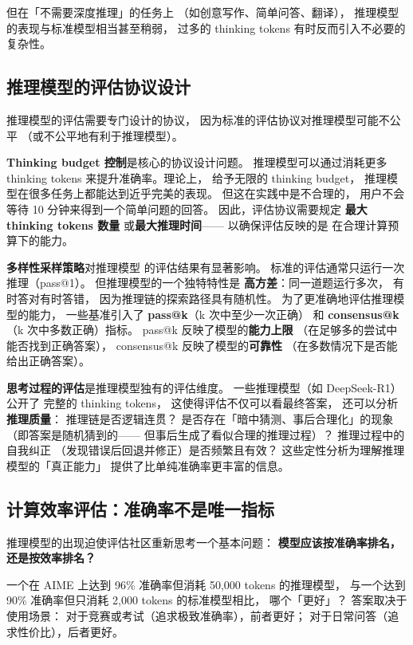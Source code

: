但在「不需要深度推理」的任务上
（如创意写作、简单问答、翻译），
推理模型的表现与标准模型相当甚至稍弱，
过多的 thinking tokens 有时反而引入不必要的复杂性。

\subsection{推理模型的评估协议设计}

推理模型的评估需要专门设计的协议，
因为标准的评估协议对推理模型可能不公平
（或不公平地有利于推理模型）。

\textbf{Thinking budget 控制}是核心的协议设计问题。
推理模型可以通过消耗更多 thinking tokens
来提升准确率。理论上，
给予无限的 thinking budget，
推理模型在很多任务上都能达到近乎完美的表现。
但这在实践中是不合理的，
用户不会等待 10 分钟来得到一个简单问题的回答。
因此，评估协议需要规定
\textbf{最大 thinking tokens 数量}
或\textbf{最大推理时间}——
以确保评估反映的是
在合理计算预算下的能力。

\textbf{多样性采样策略}对推理模型
的评估结果有显著影响。
标准的评估通常只运行一次推理（pass@1）。
但推理模型的一个独特特性是
\textbf{高方差}：同一道题运行多次，
有时答对有时答错，
因为推理链的探索路径具有随机性。
为了更准确地评估推理模型的能力，
一些基准引入了 \textbf{pass@k}（k 次中至少一次正确）
和 \textbf{consensus@k}（k 次中多数正确）指标。
pass@k 反映了模型的\textbf{能力上限}
（在足够多的尝试中能否找到正确答案），
consensus@k 反映了模型的\textbf{可靠性}
（在多数情况下是否能给出正确答案）。

\textbf{思考过程的评估}是推理模型独有的评估维度。
一些推理模型（如 DeepSeek-R1）公开了
完整的 thinking tokens，
这使得评估不仅可以看最终答案，
还可以分析\textbf{推理质量}：
推理链是否逻辑连贯？
是否存在「暗中猜测、事后合理化」的现象
（即答案是随机猜到的——
但事后生成了看似合理的推理过程）？
推理过程中的自我纠正
（发现错误后回退并修正）是否频繁且有效？
这些定性分析为理解推理模型的「真正能力」
提供了比单纯准确率更丰富的信息。

\subsection{计算效率评估：准确率不是唯一指标}

推理模型的出现迫使评估社区重新思考一个基本问题：
\textbf{模型应该按准确率排名，还是按效率排名？}

一个在 AIME 上达到 96\% 准确率但消耗 50,000 tokens 的推理模型，
与一个达到 90\% 准确率但只消耗 2,000 tokens 的标准模型相比，
哪个「更好」？
答案取决于使用场景：
对于竞赛或考试（追求极致准确率），前者更好；
对于日常问答（追求性价比），后者更好。

